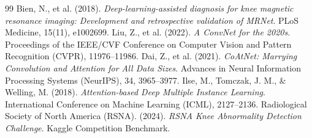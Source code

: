 \documentclass[11pt,a4paper]{article}
\begin{document}
\begin{thebibliography}{99}
 Bien, N., et al. (2018). \textit{Deep-learning-assisted diagnosis for knee magnetic resonance imaging: Development and retrospective validation of MRNet}. PLoS Medicine, 15(11), e1002699.
 Liu, Z., et al. (2022). \textit{A ConvNet for the 2020s}. Proceedings of the IEEE/CVF Conference on Computer Vision and Pattern Recognition (CVPR), 11976--11986.
 Dai, Z., et al. (2021). \textit{CoAtNet: Marrying Convolution and Attention for All Data Sizes}. Advances in Neural Information Processing Systems (NeurIPS), 34, 3965--3977.
 Ilse, M., Tomczak, J. M., \& Welling, M. (2018). \textit{Attention-based Deep Multiple Instance Learning}. International Conference on Machine Learning (ICML), 2127--2136.
 Radiological Society of North America (RSNA). (2024). \textit{RSNA Knee Abnormality Detection Challenge}. Kaggle Competition Benchmark.
\end{thebibliography}
\end{document}
